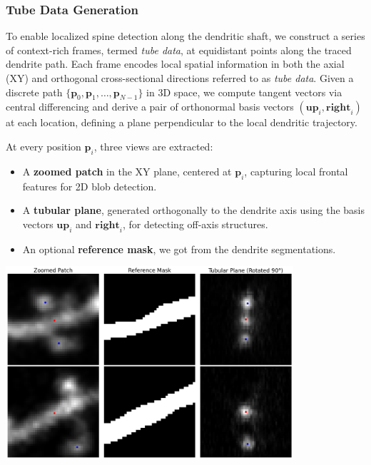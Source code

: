 \subsubsection{\textbf{Tube Data Generation}}

To enable localized spine detection along the dendritic shaft, we construct a series of context-rich frames, termed \textit{tube data}, at equidistant points along the traced dendrite path. Each frame encodes local spatial information in both the axial (XY) and orthogonal cross-sectional directions referred to as \textit{tube data}. Given a discrete path \(\{\mathbf{p}_0, \mathbf{p}_1, \ldots, \mathbf{p}_{N-1}\}\) in 3D space, we compute tangent vectors via central differencing and derive a pair of orthonormal basis vectors \((\mathbf{up}_i, \mathbf{right}_i)\) at each location, defining a plane perpendicular to the local dendritic trajectory.

At every position \(\mathbf{p}_i\), three views are extracted:

\begin{itemize}
  \item A \textbf{zoomed patch} in the XY plane, centered at \(\mathbf{p}_i\), capturing local frontal features for 2D blob detection.
  \item A \textbf{tubular plane}, generated orthogonally to the dendrite axis using the basis vectors \(\mathbf{up}_i\) and \(\mathbf{right}_i\), for detecting off-axis structures.
  \item An optional \textbf{reference mask}, we got from the dendrite segmentations.
\end{itemize}

\begin{center}
\includegraphics[width=0.8\textwidth]{figures/19_tube_data.png}
\label{fig:tube_data}
\end{center}

